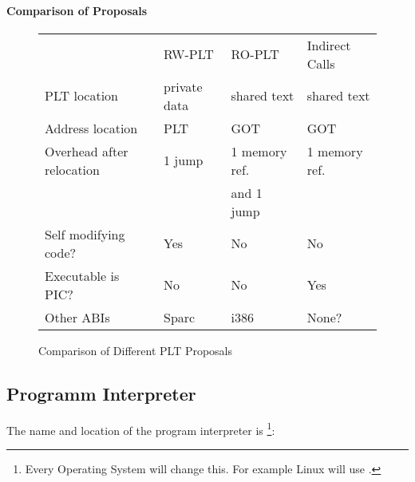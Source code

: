 
\paragraph{Comparison of Proposals}

\begin{figure}
\caption{Comparison of Different PLT Proposals}

\begin{center}
\begin{tabular}{llll}
    \hline\noalign{\smallskip}
&RW-PLT & RO-PLT & Indirect Calls \\
    \noalign{\smallskip}\hline\noalign{\smallskip}
PLT location & private data & shared text & shared text \\
Address location & PLT & GOT & GOT \\
Overhead after relocation & 1 jump & 1 memory ref. & 1 memory ref.\\
&&and 1 jump &  \\
Self modifying code? & Yes &  No & No\\
Executable is PIC? & No & No & Yes \\
Other ABIs & Sparc & i386 & None? \\
\end{tabular}
\end{center}
\end{figure}
                                

\subsection{Programm Interpreter}

The name and location of the program interpreter  is%
\footnote{Every Operating System will change this.
  For example Linux will use .}:

\bigskip
{}

